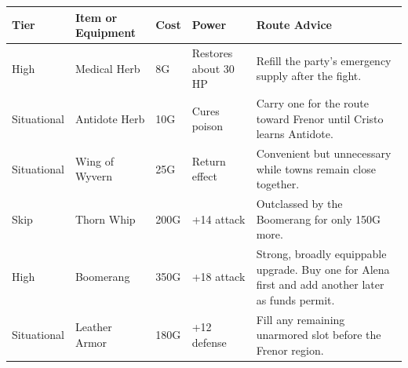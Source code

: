 \documentclass[
  american,
  10pt,
  letterpaper,
  oneside,
  open=any]{scrreprt}
\newcounter{none} %
\newenvironment{guidetable}{%
  \small\setstretch{1.0}%
  \setlength{\tabcolsep}{4pt}%
  \setlength{\LTpre}{8pt}\setlength{\LTpost}{10pt}%
  \renewcommand{\arraystretch}{1.16}%
}{ }
\begin{document}
\begin{guidetable}

{\def\LTcaptype{none} %
\begin{longtable}[]{@{}
  >{\raggedright\arraybackslash}p{}
  >{\raggedright\arraybackslash}p{}
  >{\raggedleft\arraybackslash}p{}
  >{\raggedleft\arraybackslash}p{}
  >{\raggedright\arraybackslash}p{}@{}}
\toprule\noalign{}
\begin{minipage}[b]{\linewidth}\raggedright
\color{GuideGreen}\bfseries Tier
\end{minipage} & \begin{minipage}[b]{\linewidth}\raggedright
\color{GuideGreen}\bfseries Item or Equipment
\end{minipage} & \begin{minipage}[b]{\linewidth}\raggedleft
\color{GuideGreen}\bfseries Cost
\end{minipage} & \begin{minipage}[b]{\linewidth}\raggedleft
\color{GuideGreen}\bfseries Power
\end{minipage} & \begin{minipage}[b]{\linewidth}\raggedright
\color{GuideGreen}\bfseries Route Advice
\end{minipage} \\
\midrule\noalign{}
\endhead
\bottomrule\noalign{}
\endlastfoot
High & Medical Herb & 8G & Restores about 30 HP & Refill the party's
emergency supply after the fight. \\
Situational & Antidote Herb & 10G & Cures poison & Carry one for the
route toward Frenor until Cristo learns Antidote. \\
Situational & Wing of Wyvern & 25G & Return effect & Convenient but
unnecessary while towns remain close together. \\
Skip & Thorn Whip & 200G & +14 attack & Outclassed by the Boomerang for
only 150G more. \\
High & Boomerang & 350G & +18 attack & Strong, broadly equippable
upgrade. Buy one for Alena first and add another later as funds
permit. \\
Situational & Leather Armor & 180G & +12 defense & Fill any remaining
unarmored slot before the Frenor region. \\
\end{longtable}
}

\end{guidetable}
\end{document}
